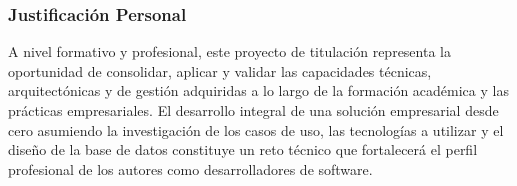 \subsubsection{Justificación Personal}
A nivel formativo y profesional, este proyecto de titulación representa la oportunidad de consolidar, aplicar y validar las capacidades técnicas, 
arquitectónicas y de gestión adquiridas a lo largo de la formación académica y las prácticas empresariales. 
El desarrollo integral de una solución empresarial desde cero asumiendo la investigación de los casos de uso, 
las tecnologías a utilizar y el diseño de la base de datos constituye un reto técnico que fortalecerá el perfil profesional de los autores como desarrolladores de software.